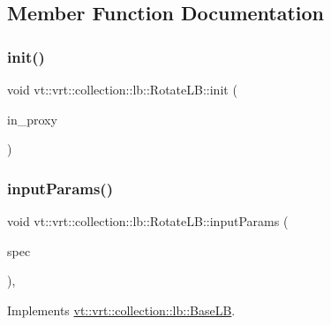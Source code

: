 \subsection{Member Function Documentation}
\mbox{\label{structvt_1_1vrt_1_1collection_1_1lb_1_1_rotate_l_b_a2f0126b5029e1348b86089470ffcd4f2}} 
\subsubsection{\texorpdfstring{init()}{init()}}
{\footnotesize\ttfamily void vt\+::vrt\+::collection\+::lb\+::\+Rotate\+L\+B\+::init (\begin{DoxyParamCaption}\item[{\hyperlink{structvt_1_1objgroup_1_1proxy_1_1_proxy}{objgroup\+::proxy\+::\+Proxy}$<$ \hyperlink{structvt_1_1vrt_1_1collection_1_1lb_1_1_rotate_l_b}{Rotate\+LB} $>$}]{in\+\_\+proxy }\end{DoxyParamCaption})}

\mbox{\label{structvt_1_1vrt_1_1collection_1_1lb_1_1_rotate_l_b_a70fc0a77f387632fc57805950b63f443}} 
\subsubsection{\texorpdfstring{input\+Params()}{inputParams()}}
{\footnotesize\ttfamily void vt\+::vrt\+::collection\+::lb\+::\+Rotate\+L\+B\+::input\+Params (\begin{DoxyParamCaption}\item[{\hyperlink{structvt_1_1vrt_1_1collection_1_1balance_1_1_spec_entry}{balance\+::\+Spec\+Entry} $\ast$}]{spec }\end{DoxyParamCaption})\hspace{0.3cm}{\ttfamily [override]}, {\ttfamily [virtual]}}



Implements \hyperlink{structvt_1_1vrt_1_1collection_1_1lb_1_1_base_l_b_a555e29aadfd428383464d6dd007506b6}{vt\+::vrt\+::collection\+::lb\+::\+Base\+LB}.

